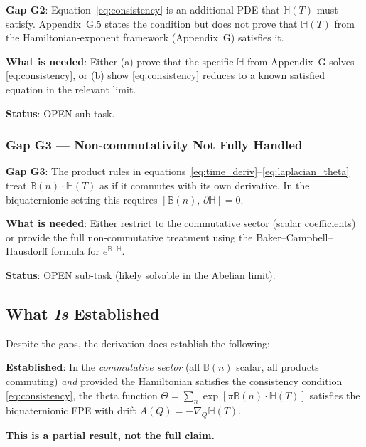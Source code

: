 \documentclass[12pt]{article}
\theoremstyle{definition}
\theoremstyle{remark}
\begin{document}
\begin{gapbox}
\textbf{Gap G2}: Equation~\eqref{eq:consistency} is an additional PDE that $\mathbb{H}(T)$
must satisfy.  Appendix~G.5 states the condition but does not prove that $\mathbb{H}(T)$
from the Hamiltonian-exponent framework (Appendix~G) satisfies it.

\textbf{What is needed}: Either
(a) prove that the specific $\mathbb{H}$ from Appendix~G solves \eqref{eq:consistency}, or
(b) show \eqref{eq:consistency} reduces to a known satisfied equation in the
    relevant limit.

\textbf{Status}: OPEN sub-task.
\end{gapbox}

\subsubsection{Gap G3 — Non-commutativity Not Fully Handled}

\begin{gapbox}
\textbf{Gap G3}: The product rules in equations~\eqref{eq:time_deriv}--\eqref{eq:laplacian_theta}
treat $\mathbb{B}(n)\cdot\mathbb{H}(T)$ as if it commutes with its own derivative.
In the biquaternionic setting this requires $[\mathbb{B}(n),\,\partial\mathbb{H}] = 0$.

\textbf{What is needed}: Either restrict to the commutative sector (scalar coefficients)
or provide the full non-commutative treatment using the Baker--Campbell--Hausdorff
formula for $e^{\mathbb{B}\cdot\mathbb{H}}$.

\textbf{Status}: OPEN sub-task (likely solvable in the Abelian limit).
\end{gapbox}

\subsection{What \emph{Is} Established}

Despite the gaps, the derivation does establish the following:

\begin{resultbox}
\textbf{Established}: In the \emph{commutative sector} (all $\mathbb{B}(n)$ scalar, all products
commuting) \emph{and} provided the Hamiltonian satisfies the consistency condition
\eqref{eq:consistency}, the theta function $\Theta = \sum_n \exp[\pi\mathbb{B}(n)\cdot\mathbb{H}(T)]$
satisfies the biquaternionic FPE with drift $A(Q) = -\nabla_Q\mathbb{H}(T)$.

\textbf{This is a partial result, not the full claim.}
\end{resultbox}
\end{document}
